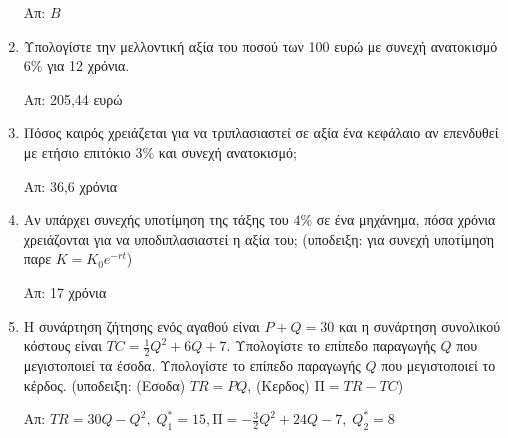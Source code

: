 \begin{enumerate}
        \hfill Απ: $B$ 

    \item Υπολογίστε την μελλοντική αξία του ποσού των 100 ευρώ με 
        συνεχή ανατοκισμό $ 6\% $ για 12 χρόνια.

        \hfill Απ: 205,44 ευρώ 

    \item Πόσος καιρός χρειάζεται για να τριπλασιαστεί σε αξία ένα 
        κεφάλαιο αν επενδυθεί με ετήσιο επιτόκιο $ 3\% $ και συνεχή
        ανατοκισμό;

        \hfill Απ: 36,6 χρόνια 

    \item Αν υπάρχει συνεχής υποτίμηση της τάξης του $ 4\% $ σε ένα
        μηχάνημα, πόσα χρόνια χρειάζονται για να υποδιπλασιαστεί η αξία του;
        (υποδειξη: για συνεχή υποτίμηση παρε $ K=K_{0}e^{-rt} $)

        \hfill Απ: 17 χρόνια 


\item Η συνάρτηση ζήτησης ενός αγαθού είναι $ P+Q = 30 $ και η συνάρτηση 
    συνολικού κόστους είναι $ TC = \frac{1}{2} Q^{2} + 6Q + 7 $.
    Υπολογίστε το επίπεδο παραγωγής $ Q $ που μεγιστοποιεί τα έσοδα.
    Υπολογίστε το επίπεδο παραγωγής $ Q $ που μεγιστοποιεί το κέρδος.
    (υποδειξη: (Εσοδα) $TR = PQ$, (Κερδος) $\text{Π} = TR-TC$)

    \hfill Απ: $ TR= 30Q-Q^{2},\; Q_{1}^{*}=15, \text{Π} = - \frac{3}{2} Q^{2} + 
    24Q -7,\; Q_{2}^{*}=8 $ 

\end{enumerate}


